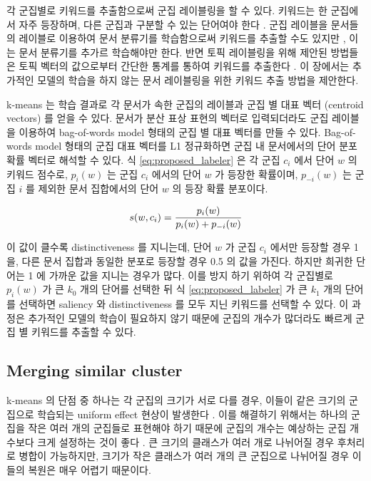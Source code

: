 \documentclass[11pt]{article}
\begin{document}
각 군집별로 키워드를 추출함으로써 군집 레이블링을 할 수 있다.
키워드는 한 군집에서 자주 등장하며, 다른 군집과 구분할 수 있는 단어여야 한다 \citep{snyder2013topic}.
군집 레이블을 문서들의 레이블로 이용하여 문서 분류기를 학습함으로써 키워드를 추출할 수도 있지만 \citep{zhang2006keyword, onan2016ensemble}, 이는 문서 분류기를 추가르 학습해야만 한다.
반면 토픽 레이블링을 위해 제안된 방법들은 토픽 벡터의 값으로부터 간단한 통계를 통하여 키워드를 추출한다 \citep{chuang2012termite, snyder2013topic}.
이 장에서는 추가적인 모델의 학습을 하지 않는 문서 레이블링을 위한 키워드 추출 방법을 제안한다.

k-means 는 학습 결과로 각 문서가 속한 군집의 레이블과 군집 별 대표 벡터 (centroid vectors) 를 얻을 수 있다.
문서가 분산 표상 표현의 벡터로 입력되더라도 군집 레이블을 이용하여 bag-of-words model 형태의 군집 별 대표 벡터를 만들 수 있다.
Bag-of-words model 형태의 군집 대표 벡터를 L1 정규화하면 군집 내 문서에서의 단어 분포 확률 벡터로 해석할 수 있다.
식 \ref{eq:proposed_labeler} 은 각 군집 $c_i$ 에서 단어 $w$ 의 키워드 점수로, $p_i(w)$ 는 군집 $c_i$ 에서의 단어 $w$ 가 등장한 확률이며, $p_{-i}(w)$ 는 군집 $i$ 를 제외한 문서 집합에서의 단어 $w$ 의 등장 확률 분포이다.

\begin{equation}
\label{eq:proposed_labeler}
\centering
s(w, c_i) = \frac{p_i (w)}{p_i (w) + p_{-i}(w)}
\end{equation}

이 값이 클수록 distinctiveness 를 지니는데, 단어 $w$ 가 군집 $c_i$ 에서만 등장할 경우 1 을, 다른 문서 집합과 동일한 분포로 등장할 경우 0.5 의 값을 가진다.
하지만 희귀한 단어는 1 에 가까운 값을 지니는 경우가 많다.
이를 방지 하기 위하여 각 군집별로 $p_i(w)$ 가 큰 $k_0$ 개의 단어를 선택한 뒤 식 \ref{eq:proposed_labeler} 가 큰 $k_1$ 개의 단어를 선택하면 saliency 와 distinctiveness 를 모두 지닌 키워드를 선택할 수 있다.
이 과정은 추가적인 모델의 학습이 필요하지 않기 때문에 군집의 개수가 많더라도 빠르게 군집 별 키워드를 추출할 수 있다.

\subsection{Merging similar cluster}

k-means 의 단점 중 하나는 각 군집의 크기가 서로 다를 경우, 이들이 같은 크기의 군집으로 학습되는 uniform effect 현상이 발생한다 \citep{xiong2009k}.
이를 해결하기 위해서는 하나의 군집을 작은 여러 개의 군집들로 표현해야 하기 때문에 군집의 개수는 예상하는 군집 개수보다 크게 설정하는 것이 좋다 \citep{liang2012k}.
큰 크기의 클래스가 여러 개로 나뉘어질 경우 후처리로 병합이 가능하지만, 크기가 작은 클래스가 여러 개의 큰 군집으로 나뉘어질 경우 이들의 복원은 매우 어렵기 때문이다.
\end{document}
